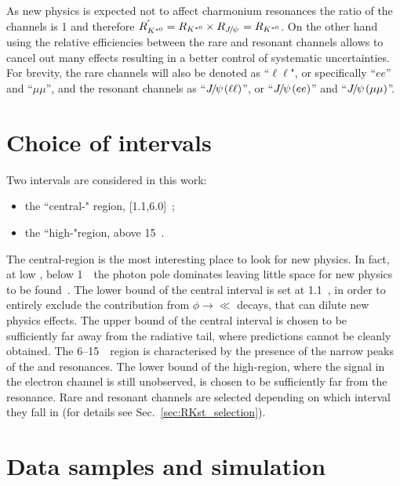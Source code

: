 
As new physics is expected not to affect charmonium resonances the ratio of the \jpsi channels
is 1 and therefore $R_{\Kstarz}^{'} = R_{\Kstarz} \times R_{\jpsi} = R_{\Kstarz}$.
On the other hand using the relative efficiencies between the rare and resonant channels
allows to cancel out many effects resulting in a better control of systematic uncertainties.  
For brevity, the rare channels will also be denoted as ``$\ell\ell$", or
specifically ``$ee$'' and ``$\mu\mu$'', and the resonant channels as ``$\jpsi(\ell\ell)$'',
or ``$\jpsi(ee)$'' and ``$\jpsi(\mu\mu)$''.

\section{Choice of \qsq intervals}
\label{sec:RKst_q2_choice}

Two \qsq intervals are considered in this work: 
\begin{itemize}
\item the ``central-\qsq" region, [1.1,6.0]~\gevgevcccc;
\item the ``high-\qsq "region, above 15~\gevgevcccc.
\end{itemize}
%
The central-\qsq region is the most interesting place to look for new physics. In fact, at low \qsq, below 
1~\gevgevcccc~the photon pole dominates leaving little space for new physics to be found~\cite{TomRDreview}.
The lower bound of the central interval is set at 1.1~\gevgevcccc, in order to entirely exclude the contribution
from $\phi\to\ll$ decays, that can dilute new physics effects.
The upper bound of the central interval is chosen to be sufficiently far away from the \jpsi radiative
tail, where predictions cannot be cleanly obtained. The 6--15~\gevgevcccc~region is characterised by the presence
of the narrow peaks of the \jpsi and \psitwos resonances. The lower bound of the high-\qsq region, where
the signal in the electron channel is still unobserved, is chosen to be sufficiently far from the \psitwos resonance.
Rare and resonant channels are selected depending on which \qsq interval they fall in (for details see Sec.~\ref{sec:RKst_selection}).


\section{Data samples and simulation}

